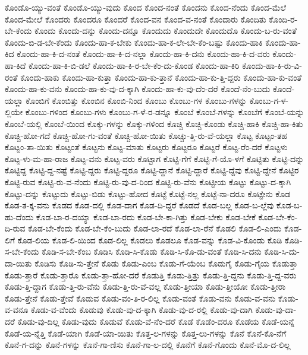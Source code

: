 {ಕೊಂಡೊ-ಯ್ಯು-ವಂತೆ
ಕೊಂಡೊ-ಯ್ಯು-ವುದು
ಕೊಂದ
ಕೊಂದ-ನಂತೆ
ಕೊಂದನು
ಕೊಂದ-ನೆಂದು
ಕೊಂದ-ಮೆಲೆ
ಕೊಂದ-ಮೇಲೆ
ಕೊಂದರು
ಕೊಂದರೂ
ಕೊಂದರೆ
ಕೊಂದ-ವನ
ಕೊಂದ-ವ-ನಂತೆ
ಕೊಂದಾರು
ಕೊಂದಿತು
ಕೊಂದಿ-ರ-ಬೇ-ಕೆಂದು
ಕೊಂದು
ಕೊಂದು-ದನ್ನು
ಕೊಂದು-ದನ್ನೂ
ಕೊಂದುದು
ಕೊಂದುದೇ
ಕೊಂದುದೊ
ಕೊಂದು-ಬ-ರು-ವಂತೆ
ಕೊಂದು-ಬಿ-ಡ-ಬೇ-ಕೆಂದು
ಕೊಂದು-ಹಾ-ಕ-ಬೇಕು
ಕೊಂದು-ಹಾ-ಕ-ಲೇ-ಬೇ-ಕೆಂ-ಬಷ್ಟು
ಕೊಂದು-ಹಾಕಿ
ಕೊಂದು-ಹಾ-ಕಿದ
ಕೊಂದು-ಹಾ-ಕಿ-ದ-ನಂತೆ
ಕೊಂದು-ಹಾ-ಕಿ-ದ-ನಲ್ಲಾ
ಕೊಂದು-ಹಾ-ಕಿ-ದನು
ಕೊಂದು-ಹಾ-ಕಿ-ದ-ವರು
ಕೊಂದು-ಹಾ-ಕಿದೆ
ಕೊಂದು-ಹಾ-ಕಿ-ಬಿ-ಡಲೆ
ಕೊಂದು-ಹಾ-ಕಿ-ರ-ಬೇ-ಕೆಂ-ದು-ಕೊಂಡ
ಕೊಂದು-ಹಾ-ಕಿರಿ
ಕೊಂದು-ಹಾ-ಕಿ-ರು-ವಿ-ರಂತೆ
ಕೊಂದು-ಹಾಕು
ಕೊಂದು-ಹಾ-ಕುತ್ತಾ
ಕೊಂದು-ಹಾ-ಕು-ತ್ತಾನೆ
ಕೊಂದು-ಹಾ-ಕು-ತ್ತಿ-ದ್ದರು
ಕೊಂದು-ಹಾ-ಕು-ವಂತೆ
ಕೊಂದು-ಹಾ-ಕು-ವನು
ಕೊಂದು-ಹಾ-ಕು-ವು-ದ-ಕ್ಕಾಗಿ
ಕೊಂದು-ಹಾ-ಕು-ವು-ದೆಂ-ದರೆ
ಕೊಂದೆ-ನೆಂ-ಬುದು
ಕೊಂದೆ-ಯಲ್ಲಾ
ಕೊಂಬಿಗೆ
ಕೊಂಬಿತ್ತು
ಕೊಂಬಿನ
ಕೊಂಬಿ-ನಿಂದ
ಕೊಂಬು
ಕೊಂಬು-ಗಳ
ಕೊಂಬು-ಗಳನ್ನು
ಕೊಂಬು-ಗ-ಳ-ಲ್ಲಿಯೇ
ಕೊಂಬು-ಗಳಿಂದ
ಕೊಂಬು-ಗಳು
ಕೊಂಬು-ಗ-ಳೆ-ರ-ಡನ್ನೂ
ಕೊಂಬೆ
ಕೊಂಬೆ-ಗಳನ್ನು
ಕೊಂಬೆಗೆ
ಕೊಂಬೆ-ಯನ್ನು
ಕೊಂಬೆ-ಯಲ್ಲಿ
ಕೊಂಬೆ-ಯಿಂದ
ಕೊಕ್ಕು-ಗಳನ್ನು
ಕೊಕ್ಕು-ಗಳಿಂದ
ಕೊಚ್ಚಿ
ಕೊಚ್ಚಿ-ಕೊಂಡು
ಕೊಚ್ಚಿ-ಹಾಕಿ
ಕೊಚ್ಚಿ-ಹಾ-ಕಿತು
ಕೊಚ್ಚಿ-ಹೋ-ಗದೆ
ಕೊಚ್ಚಿ-ಹೋ-ಗು-ವಂತೆ
ಕೊಚ್ಚಿ-ಹೋ-ಯಿತು
ಕೊಚ್ಚು-ತ್ತಿ-ರು-ವೆ-ಯಲ್ಲಾ
ಕೊಟ್ಟ
ಕೊಟ್ಟಂ-ತಹ
ಕೊಟ್ಟಂ-ತಾ-ಯಿತು
ಕೊಟ್ಟಂತೆ
ಕೊಟ್ಟನು
ಕೊಟ್ಟ-ಮಾತು
ಕೊಟ್ಟರು
ಕೊಟ್ಟರೂ
ಕೊಟ್ಟರೆ
ಕೊಟ್ಟ-ರೆಂ-ದರೆ
ಕೊಟ್ಟಳು
ಕೊಟ್ಟ-ಳು-ಮ-ಹಾ-ರಾಜ
ಕೊಟ್ಟ-ವನು
ಕೊಟ್ಟ-ವರು
ಕೊಟ್ಟಾಗ
ಕೊಟ್ಟಿ-ಗೆಗೆ
ಕೊಟ್ಟಿ-ಗೆ-ಯೊ-ಳಗೆ
ಕೊಟ್ಟಿತು
ಕೊಟ್ಟಿ-ದನ್ನು
ಕೊಟ್ಟಿದ್ದ
ಕೊಟ್ಟಿ-ದ್ದ-ನಷ್ಟೆ
ಕೊಟ್ಟಿ-ದ್ದರು
ಕೊಟ್ಟಿ-ದ್ದರೂ
ಕೊಟ್ಟಿ-ದ್ದಾನೆ
ಕೊಟ್ಟಿ-ದ್ದಾರೆ
ಕೊಟ್ಟಿ-ದ್ದೆವು
ಕೊಟ್ಟಿ-ದ್ದೇನೆ
ಕೊಟ್ಟಿರ
ಕೊಟ್ಟಿ-ರುವ
ಕೊಟ್ಟಿ-ರು-ವ-ನೆಂದು
ಕೊಟ್ಟಿ-ರು-ವು-ದ-ರಿಂದ
ಕೊಟ್ಟಿ-ರು-ವೆನು
ಕೊಟ್ಟೀಯ
ಕೊಟ್ಟು
ಕೊಟ್ಟು-ದ-ಕ್ಕಾಗಿ
ಕೊಟ್ಟು-ದನ್ನು
ಕೊಟ್ಟುದು
ಕೊಟ್ಟು-ಬಿಡು
ಕೊಟ್ಟು-ಹೋದ
ಕೊಟ್ಟೆ
ಕೊಟ್ಟೆ-ನಲ್ಲ
ಕೊಟ್ಟೆ-ನಾ-ದರೂ
ಕೊಟ್ಟೇನು
ಕೊಡ
ಕೊಡ-ತ-ಕ್ಕ-ವನು
ಕೊಡದ
ಕೊಡ-ದಲ್ಲಿ
ಕೊಡ-ದಾಗ
ಕೊಡ-ದಿ-ದ್ದರೆ
ಕೊಡದೆ
ಕೊಡ-ಬಲ್ಲ
ಕೊಡ-ಬ-ಲ್ಲೆವು
ಕೊಡ-ಬ-ಹು-ದೆಂದು
ಕೊಡ-ಬಾ-ರ-ದಯ್ಯಾ
ಕೊಡ-ಬಾ-ರದು
ಕೊಡ-ಬೇ-ಕಾ-ಗಿತ್ತು
ಕೊಡ-ಬೇಕು
ಕೊಡ-ಬೇಕೆ
ಕೊಡ-ಬೇ-ಕೆಂ-ದಿ-ರುವ
ಕೊಡ-ಬೇ-ಕೆಂದು
ಕೊಡ-ಬೇ-ಕೆಂ-ಬುದು
ಕೊಡ-ಲಾ-ರದೆ
ಕೊಡ-ಲಾ-ರೆನೆ
ಕೊಡಲಿ
ಕೊಡ-ಲಿ-ಎಂದು
ಕೊಡ-ಲಿಗೆ
ಕೊಡ-ಲಿಯ
ಕೊಡ-ಲಿ-ಯಿಂದ
ಕೊಡ-ಲಿಲ್ಲ
ಕೊಡಲು
ಕೊಡಲೂ
ಕೊಡ-ವನ್ನು
ಕೊಡ-ವಿ-ಕೊಂಡು
ಕೊಡಿ
ಕೊಡಿ-ಸ-ಬೇ-ಕೆಂದು
ಕೊಡಿ-ಸ-ಬೇ-ಕೆಂಬ
ಕೊಡಿಸಿ
ಕೊಡಿ-ಸಿ-ಕೊಡು
ಕೊಡಿ-ಸಿ-ಕೊ-ಡು-ವಂತೆ
ಕೊಡಿ-ಸಿ-ದನು
ಕೊಡಿ-ಸಿ-ದು-ದಾ-ಯಿತು
ಕೊಡಿಸು
ಕೊಡಿ-ಸು-ತ್ತೇನೆ
ಕೊಡು
ಕೊಡು-ಎಂಬ
ಕೊಡು-ಗೆ-ಯೆಂಬ
ಕೊಡುಗೈ
ಕೊಡು-ಗೈಯ
ಕೊಡುತ್ತಾ
ಕೊಡು-ತ್ತಾರೆ
ಕೊಡು-ತ್ತಾರೊ
ಕೊಡು-ತ್ತಾ-ಹೋ-ದರೆ
ಕೊಡುತ್ತಿ
ಕೊಡು-ತ್ತಿತ್ತು
ಕೊಡು-ತ್ತಿ-ದ್ದನು
ಕೊಡು-ತ್ತಿ-ದ್ದ-ವರು
ಕೊಡು-ತ್ತಿ-ದ್ದಾಗ
ಕೊಡು-ತ್ತಿ-ರು-ವೆನು
ಕೊಡು-ತ್ತಿ-ರು-ವೆ-ವಲ್ಲ
ಕೊಡು-ತ್ತೀಯಾ
ಕೊಡು-ತ್ತೀಯೋ
ಕೊಡು-ತ್ತೀರಾ
ಕೊಡು-ತ್ತೇನೆ
ಕೊಡು-ತ್ತೇವೆ
ಕೊಡುವ
ಕೊಡು-ವಂ-ತಿ-ರ-ಲಿಲ್ಲ
ಕೊಡು-ವಂತೆ
ಕೊಡು-ವನು
ಕೊಡು-ವ-ವನು
ಕೊಡು-ವ-ವನೂ
ಕೊಡು-ವ-ವೆಂದು
ಕೊಡುವು
ಕೊಡು-ವು-ದ-ಕ್ಕಾಗಿ
ಕೊಡು-ವು-ದ-ರಲ್ಲಿ
ಕೊಡು-ವು-ದಾಗಿ
ಕೊಡು-ವು-ದಾ-ದರೆ
ಕೊಡು-ವು-ದಿಲ್ಲ
ಕೊಡು-ವುದು
ಕೊಡುವೆ
ಕೊಡು-ವೆ-ನೆಂ-ದರೆ
ಕೊಡೆ
ಕೊಡೆಂ-ದರೂ
ಕೊಡೆಯ
ಕೊಡೆ-ಯನ್ನೆ
ಕೊಡೆ-ಯ-ನ್ನೆತ್ತಿ
ಕೊಡೆ-ಯಾಗಿ
ಕೊಡೆ-ಯಾ-ಯಿತು
ಕೊತ್ತ-ಲ-ಗಳನ್ನು
ಕೊತ್ತ-ಲು-ಗಳನ್ನು
ಕೊನೆ
ಕೊನೆ-ಕೊ-ನೆಗೆ
ಕೊನೆ-ಗ-ದನ್ನು
ಕೊನೆ-ಗಳನ್ನು
ಕೊನೆ-ಗಾ-ಣಿಸು
ಕೊನೆ-ಗಾ-ಲ-ದಲ್ಲಿ
ಕೊನೆಗೆ
ಕೊನೆ-ಗೊಂದು
ಕೊನೆ-ಮೊ-ದ-ಲಿಲ್ಲ
}
